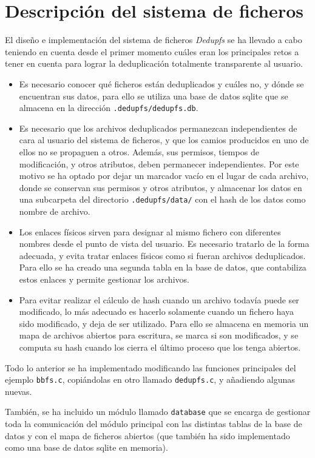 \documentclass[12pt,a4paper]{article}
\begin{document}
\newpage
\section{Descripción del sistema de ficheros}

El diseño e implementación del sistema de ficheros \emph{Dedupfs} se ha llevado a cabo teniendo en cuenta desde el primer momento cuáles eran los principales retos a tener en cuenta para lograr la deduplicación totalmente transparente al usuario.
\begin{itemize}
 \item Es necesario conocer qué ficheros están deduplicados y cuáles no, y dónde se encuentran sus datos, para ello se utiliza una base de datos sqlite que se almacena en la dirección \texttt{\small .dedupfs/dedupfs.db}.
 \item Es necesario que los archivos deduplicados permanezcan independientes de cara al usuario del sistema de ficheros, y que los camios producidos en uno de ellos no se propaguen a otros. Además, sus permisos, tiempos de modificación, y otros atributos, deben permanecer independientes. Por este motivo se ha optado por dejar un marcador vacío en el lugar de cada archivo, donde se conservan sus permisos y otros atributos, y almacenar los datos en una subcarpeta del directorio \texttt{\small .dedupfs/data/} con el hash de los datos como nombre de archivo.
 \item Los enlaces físicos sirven para designar al mismo fichero con diferentes nombres desde el punto de vista del usuario. Es necesario tratarlo de la forma adecuada, y evita tratar enlaces físicos como si fueran archivos deduplicados. Para ello se ha creado una segunda tabla en la base de datos, que contabiliza estos enlaces y permite gestionar los archivos.
 \item Para evitar realizar el cálculo de hash cuando un archivo todavía puede ser modificado, lo más adecuado es hacerlo solamente cuando un fichero haya sido modificado, y deja de ser utilizado. Para ello se almacena en memoria un mapa de archivos abiertos para escritura, se marca si son modificados, y se computa su hash cuando los cierra el último proceso que los tenga abiertos.
\end{itemize}

Todo lo anterior se ha implementado modificando las funciones principales del ejemplo \texttt{\small bbfs.c}, copiándolas en otro llamado \texttt{\small dedupfs.c}, y añadiendo algunas nuevas.

También, se ha incluido un módulo llamado \texttt{\small database} que se encarga de gestionar toda la comunicación del módulo principal con las distintas tablas de la base de datos y con el mapa de ficheros abiertos (que también ha sido implementado como una base de datos sqlite en memoria).
\end{document}

